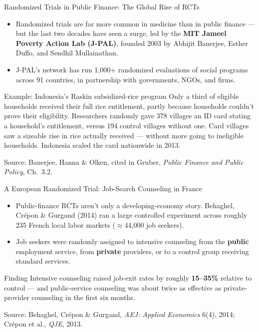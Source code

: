 \documentclass[11pt,aspectratio=169]{beamer}
\newcommand{\srcnote}[1]{{\footnotesize\color{wugray}Source: #1}}
\begin{document}
\begin{frame}{Randomized Trials in Public Finance: The Global Rise of RCTs}
 
  \begin{itemize}
    \item Randomized trials are far more common in medicine than in public finance --- but the last two decades have seen a surge, led by the \textbf{MIT Jameel Poverty Action Lab (J-PAL)}, founded 2003 by Abhijit Banerjee, Esther Duflo, and Sendhil Mullainathan.
    \item J-PAL's network has run 1,000+ randomized evaluations of social programs across 91 countries, in partnership with governments, NGOs, and firms.
  \end{itemize}
  \begin{alertblock}{Example: Indonesia's Raskin subsidized-rice program}
    Only a third of eligible households received their full rice entitlement, partly because households couldn't prove their eligibility. Researchers randomly gave 378 villages an ID card stating a household's entitlement, versus 194 control villages without one. Card villages saw a sizeable rise in rice actually received --- without more going to ineligible households. Indonesia scaled the card nationwide in 2013.
  \end{alertblock}
  \srcnote{Banerjee, Hanna \& Olken, cited in Gruber, \emph{Public Finance and Public Policy}, Ch.\ 3.2.}
\end{frame}

\begin{frame}{A European Randomized Trial: Job-Search Counseling in France}
  
  \begin{itemize}
    \item Public-finance RCTs aren't only a developing-economy story. Behaghel, Crépon \& Gurgand (2014) ran a large controlled experiment across roughly 235 French local labor markets (\(\approx\)44{,}000 job seekers).
    \item Job seekers were randomly assigned to intensive counseling from the \textbf{public} employment service, from \textbf{private} providers, or to a control group receiving standard services.
  \end{itemize}
  \begin{alertblock}{Finding}
    Intensive counseling raised job-exit rates by roughly \textbf{15--35\%} relative to control --- and public-service counseling was about twice as effective as private-provider counseling in the first six months.
  \end{alertblock}

  \srcnote{Behaghel, Crépon \& Gurgand, \emph{AEJ: Applied Economics} 6(4), 2014; Crépon et al., \emph{QJE}, 2013.}
\end{frame}
\end{document}

